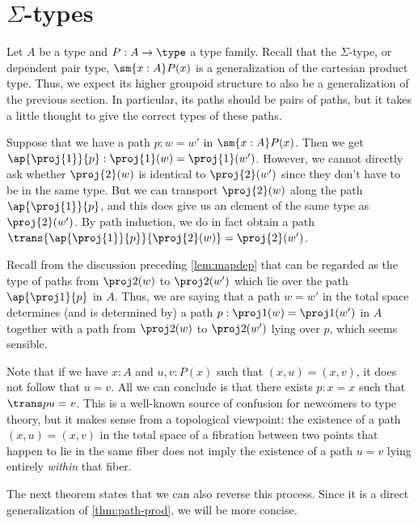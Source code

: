 %

\section{\texorpdfstring{$\Sigma$}{Σ}-types}
\label{sec:compute-sigma}

%
Let $A$ be a type and $P:A\to\type$ a type family.
Recall that the $\Sigma$-type, or dependent pair type, $\sm{x:A} P(x)$ is a generalization of the cartesian product type.
Thus, we expect its higher groupoid structure to also be a generalization of the previous section.
In particular, its paths should be pairs of paths, but it takes a little thought to give the correct types of these paths.

Suppose that we have a path $p:w=w'$ in $\sm{x:A}P(x)$.
Then we get $\ap{\proj{1}}{p}:\proj{1}(w)=\proj{1}(w')$.
However, we cannot directly ask whether $\proj{2}(w)$ is identical to $\proj{2}(w')$ since they don't have to be in the same type.
But we can transport $\proj{2}(w)$ along the path $\ap{\proj{1}}{p}$, and this does give us an element of the same type as $\proj{2}(w')$.
By path induction, we do in fact obtain a path $\trans{\ap{\proj{1}}{p}}{\proj{2}(w)}=\proj{2}(w')$.

Recall from the discussion preceding \cref{lem:mapdep} that
can be regarded as the type of paths from $\proj2(w)$ to $\proj2(w')$ which lie over the path $\ap{\proj1}{p}$ in $A$.
%
%
Thus, we are saying that a path $w=w'$ in the total space determines (and is determined by) a path $p:\proj1(w)=\proj1(w')$ in $A$ together with a path from $\proj2(w)$ to $\proj2(w')$ lying over $p$, which seems sensible.

\begin{rmk}
  Note that if we have $x:A$ and $u,v:P(x)$ such that $(x,u)=(x,v)$, it does not follow that $u=v$.
  All we can conclude is that there exists $p:x=x$ such that $\trans p u = v$.
  This is a well-known source of confusion for newcomers to type theory, but it makes sense from a topological viewpoint: the existence of a path $(x,u)=(x,v)$ in the total space of a fibration between two points that happen to lie in the same fiber does not imply the existence of a path $u=v$ lying entirely \emph{within} that fiber.
\end{rmk}

The next theorem states that we can also reverse this process.
Since it is a direct generalization of \cref{thm:path-prod}, we will be more concise.

